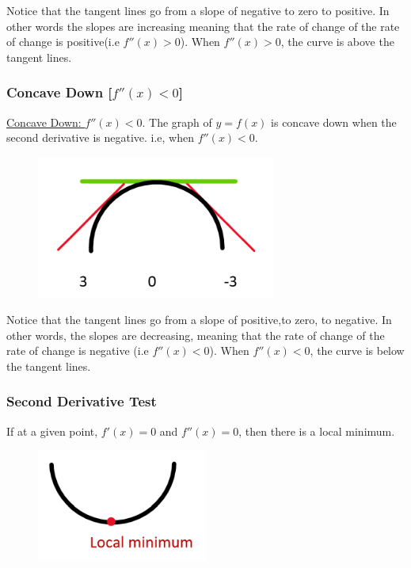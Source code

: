 \documentclass{article}
\begin{document}
Notice that the tangent lines go from a slope of negative to zero to positive. In other words the slopes are increasing meaning that the rate of change of the rate of change is positive(i.e $f''(x)>0$). When $f''(x)>0$, the curve is above the tangent lines. 

\subsubsection{Concave Down [$f''(x)<0$]}
\underline{Concave Down: } $f''(x)<0$. The graph of $y=f(x)$ is concave down when the second derivative is negative. i.e, when $f''(x)<0$.
\begin{figure}[ht]
    \centering
    \includegraphics[width=0.7\textwidth]{imgs/concave-down.png}
\end{figure}

Notice that the tangent lines go from a slope of positive,to zero, to negative. In other words, the slopes are decreasing, meaning that the rate of change of the rate of change is negative (i.e  $f''(x)<0$). When $f''(x)<0$, the curve is below the tangent lines.

\subsubsection{Second Derivative Test}
If at a given point, $f'(x)=0$ and $f''(x)=0$, then there is a local minimum.
\begin{figure}[ht]
    \centering
    \includegraphics[width=0.5\textwidth]{imgs/local-minimum.png}
\end{figure}
\end{document}
